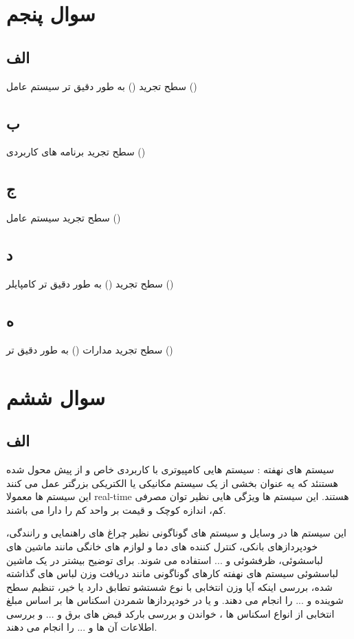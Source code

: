 \documentclass{article}
\begin{document}
\section{سوال پنجم}

\subsection{الف}
سطح تجرید ({}) به طور دقیق تر سیستم عامل ({})
\subsection{ب}
سطح تجرید برنامه های کاربردی ({})
\subsection{ج}
سطح تجرید سیستم عامل  ({})
\subsection{د}
سطح تجرید ({}) به طور دقیق تر کامپایلر  ({})
\subsection{ه}
سطح تجرید مدارات  ({}) به طور دقیق تر  ({})

\section{سوال ششم}
\subsection{الف}
سیستم های نهفته : سیستم هایی کامپیوتری با کاربردی خاص و از پیش محول شده هستنئد که یه عنوان بخشی از یک سیستم مکانیکی یا الکتریکی بزرگتر عمل می کنند این سیستم ها معمولا real-time هستند. این سیستم ها ویژگی هایی نظیر توان مصرفی کم، اندازه کوچک و قیمت بر واحد کم را دارا می باشند.

این سیستم ها در وسایل و سیستم های گوناگونی نظیر چراغ های راهنمایی و رانندگی، خودپردازهای بانکی، کنترل کننده های دما و لوازم های خانگی مانند ماشین های لباسشوئی، ظرفشوئی و ... استفاده می شوند.
برای توضیح بیشتر در یک ماشین لباسشوئی سیستم های نهفته کارهای گوناگونی مانند دریافت وزن لباس های گذاشته شده، بررسی اینکه آیا وزن انتخابی با نوع شستشو تطابق دارد یا خیر، تنظیم سطح شوینده و ... را انجام می دهند.
و یا در خودپردازها شمردن اسکناس ها بر اساس مبلغ انتخابی از انواع اسکناس ها ، خواندن و بررسی بارکد قبض های برق و ... و بررسی اطلاعات آن ها و ... را انجام می دهند.
\end{document}
